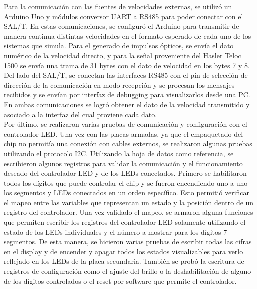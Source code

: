 Para la comunicación con las fuentes de velocidades externas, se utilizó un Arduino Uno y módulos conversor UART a RS485 para poder conectar con el SAL/T. En estas comunicaciones, se configuró el Arduino para transmitir de manera continua distintas velocidades en el formato esperado de cada uno de los sistemas que simula. Para el generado de impulsos ópticos, se envía el dato numérico de la velocidad directo, y para la señal proveniente del Hasler Teloc 1500 se envía una trama de 31 bytes con el dato de velocidad en los bytes 7 y 8. Del lado del SAL/T, se conectan las interfaces RS485 con el pin de selección de dirección de la comunicación en modo recepción y se procesan los mensajes recibidos y se envían por interfaz de debugging para visualizarlos desde una PC. En ambas comunicaciones se logró obtener el dato de la velocidad transmitido y asociado a la interfaz del cual proviene cada dato. \\ 

Por último, se realizaron varias pruebas de comunicación y configuración con el controlador LED. Una vez con las placas armadas, ya que el empaquetado del chip no permitía una conexión con cables externos, se realizaron algunas pruebas utilizando el protocolo I2C. Utilizando la hoja de datos como referencia, se escribieron algunos registros para validar la comunicación y el funcionamiento deseado del controlador LED y de los LEDs conectados. Primero se habilitaron todos los dígitos que puede controlar el chip y se fueron encendiendo uno a uno los segmentos y LEDs conectados en un orden específico. Esto permitió verificar el mapeo entre las variables que representan un estado y la posición dentro de un registro del controlador. Una vez validado el mapeo, se armaron alguna funciones que permiten escribir los registros del controlador LED solamente utilizando el estado de los LEDs individuales y el número a mostrar para los dígitos 7 segmentos. De esta manera, se hicieron varias pruebas de escribir todas las cifras en el display y de encender y apagar todos los estados visualizables para verlo reflejado en los LEDs de la placa secundaria. También se probó la escritura de registros de configuración como el ajuste del brillo o la deshabilitación de alguno de los dígitos controlados o el reset por software que permite el controlador. 